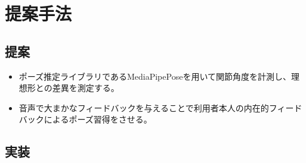 \chapter{提案手法}
\label{proposed}
\section{提案}
\begin{itemize}
  \item 
  ポーズ推定ライブラリであるMediaPipePose\cite{mediapipe_pose_landmarker}を用いて関節角度を計測し、理想形との差異を測定する。
  \item 音声で大まかなフィードバックを与えることで利用者本人の内在的フィードバックによるポーズ習得をさせる。
\end{itemize}

\section{実装}



